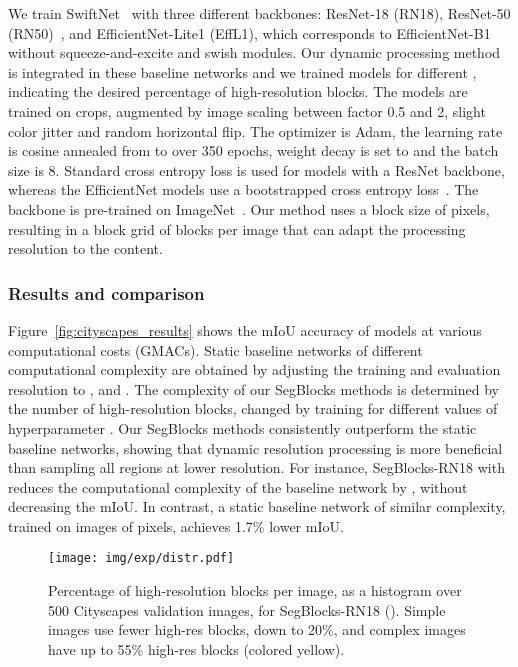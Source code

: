 We train SwiftNet~\cite{orsic_defense_2019} with three different backbones: ResNet-18 (RN18), ResNet-50 (RN50)~\cite{he_deep_2016}, and EfficientNet-Lite1 (EffL1), which corresponds to EfficientNet-B1~\cite{tan2019efficientnet} without squeeze-and-excite and swish modules. Our dynamic processing method is integrated in these baseline networks and we trained models for different , indicating the desired percentage of high-resolution blocks. 
The models are trained on  crops, augmented by image scaling between factor 0.5 and 2, slight color jitter and random horizontal flip. The optimizer is Adam, the learning rate is cosine annealed from   to  over 350 epochs, weight decay is set to  and the batch size is 8. Standard cross entropy loss is used for models with a ResNet backbone, whereas the EfficientNet models use a bootstrapped cross entropy loss~\cite{reed2014training_bootstrap}.  The backbone is pre-trained on ImageNet~\cite{deng_imagenet_2009}. Our method uses a block size of  pixels, resulting in a block grid of  blocks per image that can adapt the processing resolution to the content. 

\subsubsection{Results and comparison}

Figure~\ref{fig:cityscapes_results} shows the mIoU accuracy of models at various computational costs (GMACs). Static baseline networks of different computational complexity are obtained by adjusting the training and evaluation resolution to ,  and . The complexity of our SegBlocks methods is determined by the number of high-resolution blocks, changed by training for different values of hyperparameter . 
Our SegBlocks methods consistently outperform the static baseline networks, showing that dynamic resolution processing is more beneficial than sampling all regions at lower resolution. For instance, SegBlocks-RN18 with  reduces the computational complexity of the baseline network by , without decreasing the mIoU. In contrast, a static baseline network of similar complexity, trained on images of  pixels, achieves 1.7\% lower mIoU. 


\begin{figure}[tb!]
\centering
\texttt{[image: img/exp/distr.pdf]}
\caption{Percentage of high-resolution blocks per image, as a histogram over 500 Cityscapes validation images, for SegBlocks-RN18 (). Simple images use fewer high-res blocks, down to 20\%, and complex images have up to 55\% high-res blocks (colored yellow).}
\label{fig:cityscapes_distr}
\end{figure}

